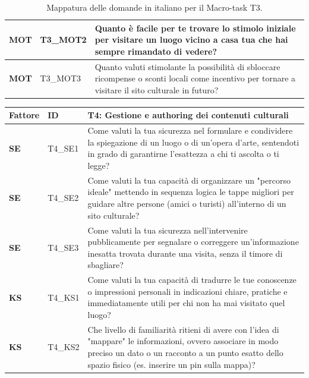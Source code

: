 \begin{table}[H]
\begin{tabular}{
        |>{\centering\arraybackslash\bfseries}p{1.5cm}
        |>{\centering\arraybackslash}p{2.2cm}
        |>{\raggedright\arraybackslash}p{9.8cm}|
    }
        \hline
        MOT & T3\_MOT2 & Quanto è facile per te trovare lo stimolo iniziale per visitare un luogo vicino a casa tua che hai sempre rimandato di vedere? \\
        \hline
        \rowcolor{culturiaBeige}
        MOT & T3\_MOT3 & Quanto valuti stimolante la possibilità di sbloccare ricompense o sconti locali come incentivo per tornare a visitare il sito culturale in futuro? \\
        \hline
    \end{tabular}
    \vspace{0.15cm}
    \caption{Mappatura delle domande in italiano per il Macro-task T3.}
    \label{tab:domande_t3_it}
\end{table}

\begin{table}[H]
    \centering
    \small
    \renewcommand{\arraystretch}{1.3}
    \begin{tabular}{
        |>{\centering\arraybackslash\bfseries}p{1.5cm}
        |>{\centering\arraybackslash}p{2.2cm}
        |>{\raggedright\arraybackslash}p{9.8cm}|
    }
        \hline
        \rowcolor{culturiaRed}
        \textcolor{culturiaWhite}{\textbf{Fattore}} &
        \textcolor{culturiaWhite}{\textbf{ID}} &
        \textcolor{culturiaWhite}{\textbf{T4: Gestione e authoring dei contenuti culturali}} \\
        \hline
        \rowcolor{culturiaBeige}
        SE & T4\_SE1 & Come valuti la tua sicurezza nel formulare e condividere la spiegazione di un luogo o di un'opera d'arte, sentendoti in grado di garantirne l'esattezza a chi ti ascolta o ti legge? \\
        \hline
        SE & T4\_SE2 & Come valuti la tua capacità di organizzare un "percorso ideale" mettendo in sequenza logica le tappe migliori per guidare altre persone (amici o turisti) all'interno di un sito culturale? \\
        \hline
        \rowcolor{culturiaBeige}
        SE & T4\_SE3 & Come valuti la tua sicurezza nell'intervenire pubblicamente per segnalare o correggere un'informazione inesatta trovata durante una visita, senza il timore di sbagliare? \\
        \hline
        KS & T4\_KS1 & Come valuti la tua capacità di tradurre le tue conoscenze o impressioni personali in indicazioni chiare, pratiche e immediatamente utili per chi non ha mai visitato quel luogo? \\
        \hline
        \rowcolor{culturiaBeige}
        KS & T4\_KS2 & Che livello di familiarità ritieni di avere con l'idea di "mappare" le informazioni, ovvero associare in modo preciso un dato o un racconto a un punto esatto dello spazio fisico (es. inserire un pin sulla mappa)? \\

\end{tabular}
\end{table}

